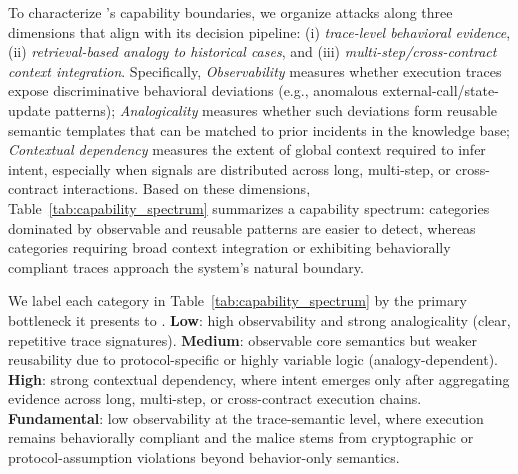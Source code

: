 To characterize \approach{}'s capability boundaries, we organize attacks along three dimensions that align with its decision pipeline: (i) \emph{trace-level behavioral evidence}, (ii) \emph{retrieval-based analogy to historical cases}, and (iii) \emph{multi-step/cross-contract context integration}. Specifically, \textit{Observability} measures whether execution traces expose discriminative behavioral deviations (e.g., anomalous external-call/state-update patterns); \textit{Analogicality} measures whether such deviations form reusable semantic templates that can be matched to prior incidents in the knowledge base; \textit{Contextual dependency} measures the extent of global context required to infer intent, especially when signals are distributed across long, multi-step, or cross-contract interactions.
Based on these dimensions, Table~\ref{tab:capability_spectrum} summarizes a capability spectrum: categories dominated by observable and reusable patterns are easier to detect, whereas categories requiring broad context integration or exhibiting behaviorally compliant traces approach the system’s natural boundary.

We label each category in Table~\ref{tab:capability_spectrum} by the primary bottleneck it presents to \approach{}. \textbf{Low}: high observability and strong analogicality (clear, repetitive trace signatures). \textbf{Medium}: observable core semantics but weaker reusability due to protocol-specific or highly variable logic (analogy-dependent). \textbf{High}: strong contextual dependency, where intent emerges only after aggregating evidence across long, multi-step, or cross-contract execution chains. \textbf{Fundamental}: low observability at the trace-semantic level, where execution remains behaviorally compliant and the malice stems from cryptographic or protocol-assumption violations beyond behavior-only semantics.


